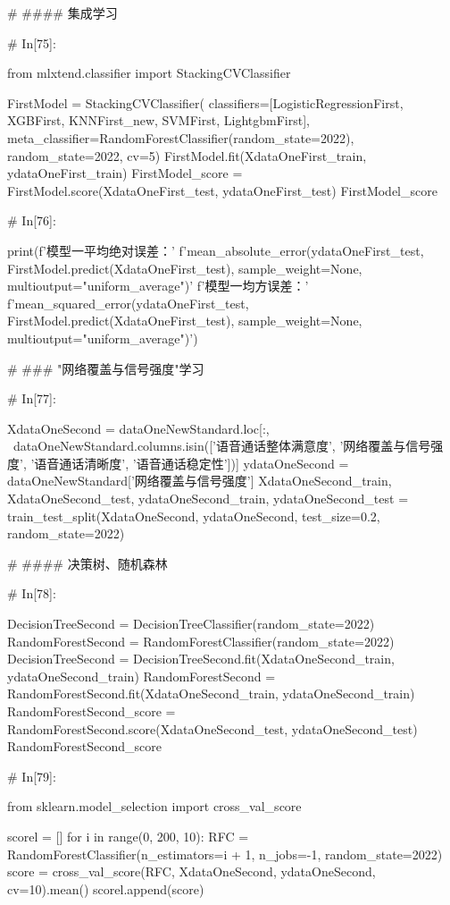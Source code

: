 \documentclass{MathorCupmodeling}
\begin{document}
\begin{python}
	# #### 集成学习
	
	# In[75]:
	
	
	from mlxtend.classifier import StackingCVClassifier
	
	FirstModel = StackingCVClassifier(
		classifiers=[LogisticRegressionFirst, XGBFirst, KNNFirst_new, SVMFirst, LightgbmFirst],
		meta_classifier=RandomForestClassifier(random_state=2022), random_state=2022, cv=5)
	FirstModel.fit(XdataOneFirst_train, ydataOneFirst_train)
	FirstModel_score = FirstModel.score(XdataOneFirst_test, ydataOneFirst_test)
	FirstModel_score
	
	# In[76]:
	
	
	print(f'模型一平均绝对误差：'
		  f'{mean_absolute_error(ydataOneFirst_test, FirstModel.predict(XdataOneFirst_test), sample_weight=None, multioutput="uniform_average")}\n'
		  f'模型一均方误差：'
		  f'{mean_squared_error(ydataOneFirst_test, FirstModel.predict(XdataOneFirst_test), sample_weight=None, multioutput="uniform_average")}')
	
	# ### "网络覆盖与信号强度"学习
	
	# In[77]:
	
	
	XdataOneSecond = dataOneNewStandard.loc[:, ~dataOneNewStandard.columns.isin(['语音通话整体满意度', '网络覆盖与信号强度', '语音通话清晰度', '语音通话稳定性'])]
	ydataOneSecond = dataOneNewStandard['网络覆盖与信号强度']
	XdataOneSecond_train, XdataOneSecond_test, ydataOneSecond_train, ydataOneSecond_test = train_test_split(XdataOneSecond, ydataOneSecond, test_size=0.2, random_state=2022)
	
	# #### 决策树、随机森林
	
	# In[78]:
	
	
	DecisionTreeSecond = DecisionTreeClassifier(random_state=2022)
	RandomForestSecond = RandomForestClassifier(random_state=2022)
	DecisionTreeSecond = DecisionTreeSecond.fit(XdataOneSecond_train, ydataOneSecond_train)
	RandomForestSecond = RandomForestSecond.fit(XdataOneSecond_train, ydataOneSecond_train)
	RandomForestSecond_score = RandomForestSecond.score(XdataOneSecond_test, ydataOneSecond_test)
	RandomForestSecond_score
	
	# In[79]:
	
	
	from sklearn.model_selection import cross_val_score
	
	scorel = []
	for i in range(0, 200, 10):
		RFC = RandomForestClassifier(n_estimators=i + 1,
									 n_jobs=-1,
									 random_state=2022)
		score = cross_val_score(RFC, XdataOneSecond, ydataOneSecond, cv=10).mean()
		scorel.append(score)
	

\end{python}
\end{document}
